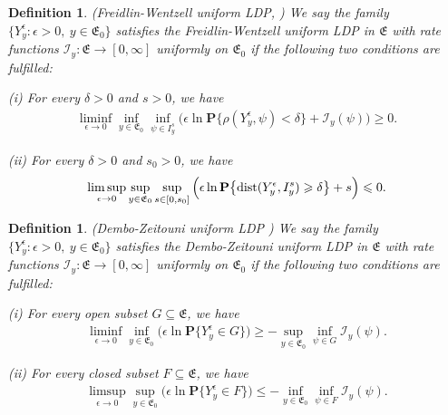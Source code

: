 \documentclass[11pt]{article}
\newcommand{\dist}{{\rm dist}}
\renewcommand{\leq}{\leqslant}
\renewcommand{\geq}{\geqslant}  %
\newtheorem{definition}[theorem]{Definition}
\numberwithin{equation}{section}
\begin{document}
\begin{definition}\label{LDP}
(Freidlin-Wentzell uniform LDP, \cite[Section 3.3]{Freidlin})
We say the family $\{Y^\epsilon_y: \epsilon>0,\ y\in\mathfrak{E}_0\}$ satisfies the Freidlin-Wentzell uniform LDP in $\mathfrak{E}$ with rate functions $\mathcal{I}_y:\mathfrak{E}
\rightarrow[0,\infty]$ uniformly
on $\mathfrak{E}_0$ if the following two
conditions are fulfilled:

(i) For every $\delta>0$ and $s>0$, we have
\begin{align*}
\liminf_{\epsilon\rightarrow0}
\inf_{y\in\mathfrak{E}_0}
\inf_{\psi\in I^s_y}\Big(\epsilon \ln
\mathbf{P}\big\{\rho(Y^\epsilon_y,\psi)<\delta\big\}         +\mathcal{I}_y(\psi)\Big)\geq0.
\end{align*}

(ii) For every $\delta>0$ and $s_0>0$, we have
\begin{align*}
\limsup_{\epsilon\rightarrow0}
\sup_{y\in\mathfrak{E}_0}
\sup_{s\in[0,s_0]}\Big(\epsilon \ln
\mathbf{P}\big\{ \dist(Y_y^\epsilon, I_y^s)\geq\delta       \big\}         +s\Big)\leq0.
\end{align*}
\end{definition}

\begin{definition}\label{LDP-}
(Dembo-Zeitouni uniform LDP \cite[Corollary 5.6.15]{Dembo})
We say the family $\{Y^\epsilon_y: \epsilon>0,\ y\in\mathfrak{E}_0\}$ satisfies the Dembo-Zeitouni uniform LDP in $\mathfrak{E}$ with rate functions $\mathcal{I}_y:\mathfrak{E}
\rightarrow[0,\infty]$ uniformly
on $\mathfrak{E}_0$ if the following two
conditions are fulfilled:

(i) For every open subset $G\subseteq\mathfrak{E}$, we have
\begin{align*}
\liminf_{\epsilon\rightarrow0}
\inf_{y\in\mathfrak{E}_0}\Big(\epsilon \ln
\mathbf{P}\big\{ Y^\epsilon_y\in G\big\}         \Big)\geq -\sup_{y\in\mathfrak{E}_0}\inf_{\psi\in G}     \mathcal{I}_y(\psi).
\end{align*}

(ii) For every closed subset $F\subseteq\mathfrak{E}$, we have
\begin{align*}
\limsup_{\epsilon\rightarrow0}
\sup_{y\in\mathfrak{E}_0}\Big(\epsilon \ln
\mathbf{P}\big\{ Y_y^\epsilon\in F      \big\}         \Big)\leq-\inf_{y\in\mathfrak{E}_0}\inf_{\psi\in F}     \mathcal{I}_y(\psi).
\end{align*}
\end{definition}
\end{document}
